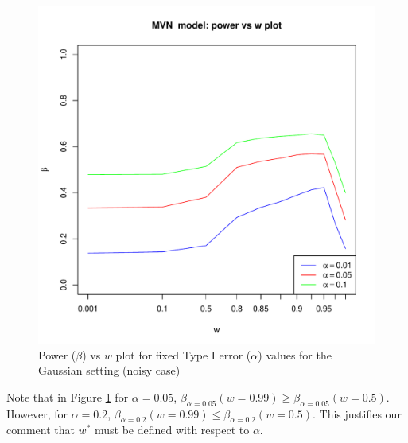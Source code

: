 \documentclass[11pt]{article} %
\begin{document}
\begin{figure}
\includegraphics[scale=0.65]{OOSMVN-power-w-c001.pdf}
\caption{Power ($\beta$) vs $w$ plot for fixed Type I error ($\alpha$) values for the Gaussian setting (noisy case)}
\label{fig:MVN-c001-beta-w}
\end{figure}
Note that in Figure \ref{fig:MVN-c001-beta-w} for $\alpha=0.05$, $\beta_{\alpha=0.05}(w=0.99)\geq\beta_{\alpha=0.05}(w=0.5)$. However, for $\alpha=0.2$, $\beta_{\alpha=0.2}(w=0.99)\leq\beta_{\alpha=0.2}(w=0.5)$. This justifies our comment that  $w^{*}$  must be defined with respect to $\alpha$.

\end{document}
